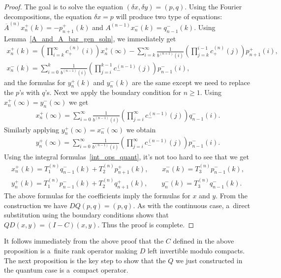 \documentclass[11pt]{article}
\numberwithin{equation}{section}
\begin{document}
\begin{proof}
The goal is to solve the equation $(\delta x, \delta y) = (p,q)$.
Using the Fourier decompositions, the equation $\delta x = p$ will produce two type of equations:
$\overline{A}^{(n)}x_n^+(k) = -p_{n+1}^+(k)$ and $A^{(n-1)}x_n^-(k) = q_{n-1}^-(k)$.
Using Lemma~\ref{A_and_A_bar_gen_soln}, we immediately get
\begin{gather*}
x_n^+(k) = \left(\prod\limits_{i=k}^\infty c_+^{(n)}(i)\right)x_n^+(\infty) -
\sum\limits_{i=k}^\infty\frac{1}{b^{(n+1)}(i)}\left(\prod\limits_{j=k}^{i-1}c_+^{(n)}(j)\right)p_{n+1}^+(i),
\\
x_n^-(k) = \sum\limits_{i=0}^k \frac{1}{b^{(n-1)}(i)}\left(\prod\limits_{j=i}^{k-1} c_-^{(n-1)}(j)\right)p_{n-1}^-(i),
\end{gather*}
and the formulas for $y_n^+(k)$ and $y_n^-(k)$ are the same except we need to replace the $p$'s with $q$'s.
Next we apply the boundary condition for $n\ge 1$.
Using $x_n^+(\infty) = y_n^-(\infty)$ we get
\begin{gather*}
x_n^+(\infty) = \sum\limits_{i=0}^\infty \frac{1}{b^{(n-1)}(i)}\left(\prod\limits_{j=i}^\infty
c_-^{(n-1)}(j)\right)q_{n-1}^-(i).
\end{gather*}
Similarly applying $y_n^+(\infty) = x_n^-(\infty)$ we obtain
\begin{gather*}
y_n^+(\infty) = \sum\limits_{i=0}^\infty \frac{1}{b^{(n-1)}(i)}\left(\prod\limits_{j=i}^\infty
c_-^{(n-1)}(j)\right)p_{n-1}^-(i).
\end{gather*}
Using the integral formulas~\eqref{int_ops_quant}, it's not too hard to see that we get
\begin{gather*}
x_n^+(k) = T_1^{(n)}q_{n-1}^-(k) + T_2^{(n)}p_{n+1}^+(k),
\qquad
x_n^-(k) = T_3^{(n)}p_{n-1}^-(k),
\\
y_n^+(k) = T_1^{(n)}p_{n-1}^-(k) + T_2^{(n)}q_{n+1}^+(k),
\qquad
y_n^-(k) = T_3^{(n)}q_{n-1}^-(k).
\end{gather*}
The above formulas for the coef\/f\/icients imply the formulas for ${x}$ and ${y}$.
From the construction we have $DQ(p,q)=(p,q)$.
As with the continuous case, a~direct substitution using the boundary conditions shows that $QD(x,y) = (I-C)(x,y)$.
Thus the proof is complete.
\end{proof}

It follows immediately from the above proof that the $C$ def\/ined in the above proposition is a~f\/inite rank operator
making $D$ left invertible modulo compacts.
The next proposition is the key step to show that the $Q$ we just constructed in the quantum case is a~compact operator.
\end{document}
